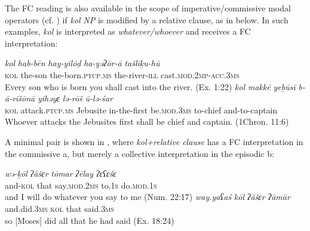 \documentclass[output=paper]{langsci/langscibook}
\begin{document}
The FC reading is also available in the scope of imperative/commissive modal operators (cf. \citealt{Dayal2013}) if \textit{kol} \textit{NP} is modified by a relative clause, as in  below. In such examples, \textit{kol} is interpreted as \textit{whatever/whoever} and receives a FC interpretation:

\ea%
    \label{ex:doron:54}
    \ea
    \gll \textit{kol}   \textit{hab-bēn} \textit{hay-yilōḏ}                 \textit{ha-yəʔōr-ā}     \textit{tašlīḵu-hū}\\
         \textsc{kol} the-son  the-born.\textsc{ptcp.ms}  the-river-\textsc{ill}  cast.\textsc{mod.2mp-acc.3ms} \\
    \glt Every son who is born you shall cast into the river. (Ex. 1:22)
    \ex
    \gll \textit{kol}   \textit{makkē}                 \textit{yeḇūsī}    \textit{b-ā-rīšōnā}     \textit{yihǝyɛ}            \textit{lə-rōš}     \textit{ū-lə-śar}\\
         \textsc{kol} attack.\textsc{ptcp.ms}  Jebusite  in-the-first  be.\textsc{mod.3ms} to-chief  and-to-captain\\
    \glt Whoever attacks the Jebusites first shall be\textsuperscript{} chief and captain. (1Chron. 11:6)
    \z
\z

A minimal pair is shown in , where \textit{kol+relative} \textit{clause} has a FC interpretation in the commissive a, but merely a collective interpretation in the episodic b:

\ea%
    \label{ex:doron:55}
    \ea
    \gll \textit{wə-ḵōl}     \textit{ʔăšɛr}  \textit{tōmar}               \textit{ʔēlay}     \textit{ʔɛʕɛśɛ}\\
         and-\textsc{kol}  that    say.\textsc{mod}.\textsc{2ms}   to.\textsc{1s}     do.\textsc{mod.1s}\\
    \glt and I will do whatever you say to me (Num. 22:17)
    \ex
    \gll \textit{way.yaʕaś}      \textit{kōl}   \textit{ʔăšɛr}  \textit{ʔāmār} \\
         and.did.\textsc{3ms}   \textsc{kol} that     said.\textsc{3ms}\\
    \glt so [Moses] did all that he had said (Ex. 18:24)
    \z
\z
\end{document}
